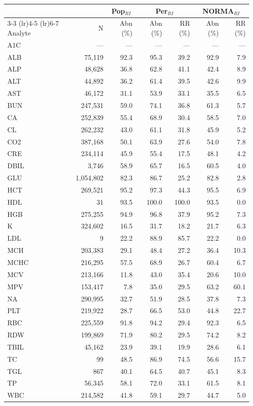 \begin{table}[ht]
\centering
\footnotesize
\begin{tabular}{lrrrrrr}
\toprule
 & & \multicolumn{1}{c}{Pop$_{RI}$} & \multicolumn{2}{c}{Per$_{RI}$} & \multicolumn{2}{c}{NORMA$_{RI}$} \\
\cmidrule(lr){3-3} \cmidrule(lr){4-5} \cmidrule(lr){6-7}
Analyte & N & Abn (\%) & Abn (\%) & RR (\%) & Abn (\%) & RR (\%) \\
\midrule
A1C & --- & --- & --- & --- & --- & --- \\
ALB & 75,119 & 92.3 & 95.3 & 39.2 & 92.9 & 7.9 \\
ALP & 48,628 & 36.8 & 62.8 & 41.1 & 42.4 & 8.9 \\
ALT & 44,892 & 36.2 & 61.4 & 39.5 & 42.6 & 9.9 \\
AST & 46,172 & 31.1 & 53.9 & 33.1 & 35.5 & 6.5 \\
BUN & 247,531 & 59.0 & 74.1 & 36.8 & 61.3 & 5.7 \\
CA & 252,839 & 55.4 & 68.9 & 30.4 & 58.5 & 7.0 \\
CL & 262,232 & 43.0 & 61.1 & 31.8 & 45.9 & 5.2 \\
CO2 & 387,168 & 50.1 & 63.9 & 27.6 & 54.0 & 7.8 \\
CRE & 234,114 & 45.9 & 55.4 & 17.5 & 48.1 & 4.2 \\
DBIL & 3,746 & 58.9 & 65.7 & 16.5 & 60.5 & 4.0 \\
GLU & 1,054,802 & 82.3 & 86.7 & 25.2 & 82.8 & 2.8 \\
HCT & 269,521 & 95.2 & 97.3 & 44.3 & 95.5 & 6.9 \\
HDL & 31 & 93.5 & 100.0 & 100.0 & 93.5 & 0.0 \\
HGB & 275,255 & 94.9 & 96.8 & 37.9 & 95.2 & 7.3 \\
K & 324,602 & 16.5 & 31.7 & 18.2 & 21.7 & 6.3 \\
LDL & 9 & 22.2 & 88.9 & 85.7 & 22.2 & 0.0 \\
MCH & 203,383 & 29.1 & 48.4 & 27.2 & 36.4 & 10.3 \\
MCHC & 216,295 & 57.5 & 68.9 & 26.7 & 60.4 & 6.7 \\
MCV & 213,166 & 11.8 & 43.0 & 35.4 & 20.6 & 10.0 \\
MPV & 153,417 & 7.8 & 35.0 & 29.5 & 63.2 & 60.1 \\
NA & 290,995 & 32.7 & 51.9 & 28.5 & 37.8 & 7.3 \\
PLT & 219,922 & 28.7 & 66.5 & 53.0 & 44.8 & 22.7 \\
RBC & 225,559 & 91.8 & 94.2 & 29.4 & 92.3 & 6.5 \\
RDW & 199,869 & 71.9 & 80.2 & 29.5 & 74.2 & 8.2 \\
TBIL & 45,162 & 23.9 & 39.1 & 19.9 & 28.6 & 6.1 \\
TC & 99 & 48.5 & 86.9 & 74.5 & 56.6 & 15.7 \\
TGL & 867 & 40.1 & 64.5 & 40.7 & 45.1 & 8.3 \\
TP & 56,345 & 58.1 & 72.0 & 33.1 & 61.5 & 8.1 \\
WBC & 214,582 & 41.8 & 59.1 & 29.7 & 44.7 & 5.0 \\
\bottomrule
\end{tabular}
\label{tab:eicu_prevalence}
\end{table}